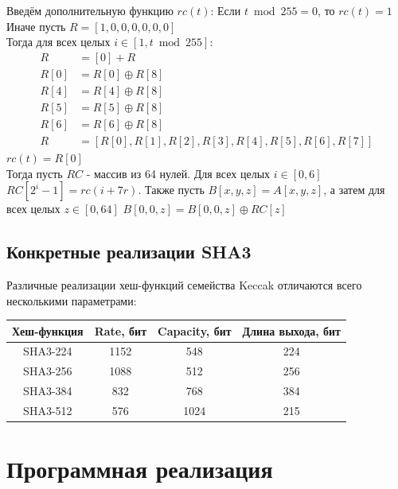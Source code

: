\documentclass[a4paper]{article}
\begin{document}
\begin{enumerate}
{      Введём дополнительную функцию $rc(t)$:
      Если $t\bmod 255 = 0$, то $rc(t) = 1$ \\
      Иначе пусть $R = [1, 0, 0, 0, 0, 0, 0]$\\
      Тогда для всех целых $i \in [1, t\bmod 255]$:
      \begin{align}
        R &= [0] + R\\
        R[0] &= R[0] \oplus R[8] \\
        R[4] &= R[4] \oplus R[8] \\
        R[5] &= R[5] \oplus R[8] \\
        R[6] &= R[6] \oplus R[8] \\
        R &= [R[0], R[1], R[2], R[3], R[4], R[5], R[6], R[7]]
      \end{align}
      $rc(t) = R[0]$\\
      Тогда пусть $RC$ - массив из 64 нулей. Для всех целых $i \in [0, 6]$\\ $RC[2^i - 1] = rc(i + 7r)$.
      Также пусть $B[x, y, z] = A[x, y, z]$, а затем для всех целых $z \in [0, 64]$
      $B[0, 0, z] = B[0, 0, z] \oplus RC[z]$
    }
  \end{enumerate}

  \subsection{Конкретные реализации SHA3}

  Различные реализации хеш-функций семейства Keccak отличаются всего несколькими параметрами:
  \begin{table}[H]
    \centering
    \begin{tabular}{|c|c|c|c|}
      \hline
      Хеш-функция & Rate, бит & Capacity, бит & Длина выхода, бит \\
      \hline
      SHA3-224 & 1152 & 548 & 224 \\
      \hline
      SHA3-256 & 1088 & 512 & 256 \\
      \hline
      SHA3-384 & 832 & 768 & 384 \\
      \hline 
      SHA3-512 & 576 & 1024 & 215 \\
      \hline
    \end{tabular}
  \end{table}

  \newpage
  \section{Программная реализация}
\end{document}
